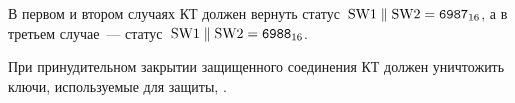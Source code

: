 В первом и втором случаях КТ должен вернуть 
статус~$\text{SW1} \parallel \text{SW2} = \texttt{6987}_{16}$, 
а в третьем случае~--- статус~$\text{SW1} \parallel \text{SW2} = 
\texttt{6988}_{16}$.  

При принудительном закрытии защищенного соединения КТ должен уничтожить 
ключи, используемые для защиты, . 
